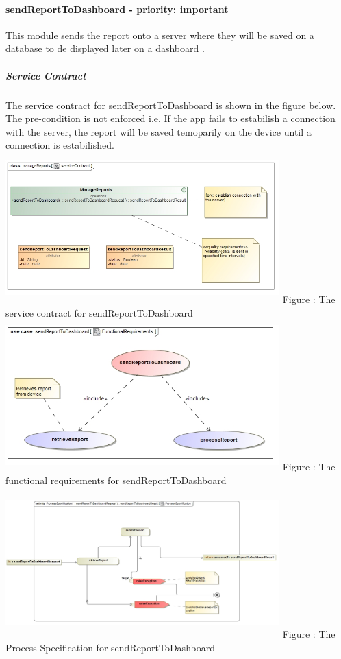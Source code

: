 \documentclass[hidelinks, 12pt, oneside]{article}
\begin{document}
		\paragraph{ sendReportToDashboard - priority: important}
		This module sends the report onto a server where they will be saved on a database to de displayed later on a dashboard .\newline
		\subparagraph{Service Contract}
			The service contract for sendReportToDashboard is shown in the figure below. The pre-condition is not enforced i.e. If the app fails to estabilish a connection with the server, the report will be saved temoparily on the device until a connection is estabilished.\newline
		\includegraphics[width=400px,height=220px]{img/serviceContractSendReportToDashboard.jpg}
			Figure : The service contract for sendReportToDashboard\newline \newline \newline
		\includegraphics[width=400px,height=220px]{img/functionalRequirementsSendReportToDashboard.jpg}
			Figure : The functional requirements for sendReportToDashboard\newline
		\includegraphics[width=400px,height=220px]{img/ProcessSpecificationSendResportToDashboard.jpg}
						Figure : The Process Specification for sendReportToDashboard\newline
						
\end{document}
